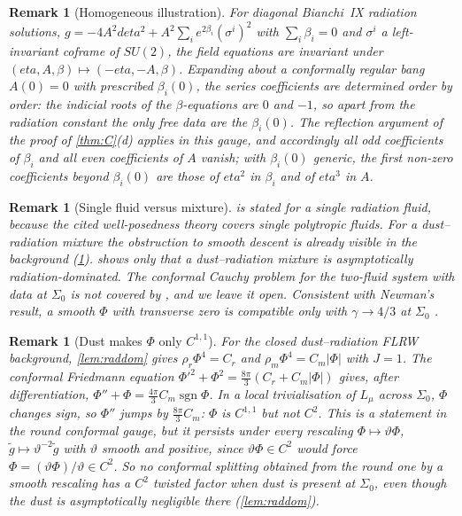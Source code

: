 \documentclass[11pt]{article}
\theoremstyle{canonmath}
\newtheorem{remark}[theorem]{Remark}
\theoremstyle{canonpostulate}
\theoremstyle{canonproposition}
\theoremstyle{canonmath}
\theoremstyle{canonproposition}
\providecommand{\Lmu}{\mathcal{L}_\mu}
\def\mathcal#1{#1}%
\def\eta{eta}%
\begin{document}
\begin{remark}[Homogeneous illustration]\label{rem:b9series}
For diagonal Bianchi~IX radiation solutions, $g = -4A^2d\eta^2 + A^2\sum_ie^{2\beta_i}(\sigma^i)^2$ with $\sum_i\beta_i = 0$ and $\sigma^i$ a left-invariant coframe of $SU(2)$, the field equations are invariant under $(\eta,A,\beta)\mapsto(-\eta,-A,\beta)$. Expanding about a conformally regular bang $A(0) = 0$ with prescribed $\beta_i(0)$, the series coefficients are determined order by order: the indicial roots of the $\beta$-equations are $0$ and $-1$, so apart from the radiation constant the only free data are the $\beta_i(0)$. The reflection argument of the proof of \cref{thm:C}(d) applies in this gauge, and accordingly all odd coefficients of $\beta_i$ and all even coefficients of $A$ vanish; with $\beta_i(0)$ generic, the first non-zero coefficients beyond $\beta_i(0)$ are those of $\eta^2$ in $\beta_i$ and of $\eta^3$ in $A$.
\end{remark}

\begin{remark}[Single fluid versus mixture]
 is stated for a single radiation fluid, because the cited well-posedness theory covers single polytropic fluids. For a dust--radiation mixture the obstruction to smooth descent is already visible in the background (\cref{rem:dust}).  shows only that a dust--radiation mixture is \emph{asymptotically} radiation-dominated. The conformal Cauchy problem for the two-fluid system with data at $\Sigma_0$ is not covered by \cite{AnguigeTod1999a}, and we leave it open. Consistent with Newman's result, a smooth $\Phi$ with transverse zero is compatible only with $\gamma\to4/3$ at $\Sigma_0$ \cite{Newman1993a,AnguigeTod1999a}.
\end{remark}

\begin{remark}[Dust makes $\Phi$ only $C^{1,1}$]\label{rem:dust}
For the closed dust--radiation FLRW background, \cref{lem:raddom} gives $\rho_r\Phi^4 = C_r$ and $\rho_m\Phi^4 = C_m|\Phi|$ with $J = 1$. The conformal Friedmann equation $\Phi'^2 + \Phi^2 = \tfrac{8\pi}{3}(C_r + C_m|\Phi|)$ gives, after differentiation, $\Phi'' + \Phi = \tfrac{4\pi}{3}C_m\operatorname{sgn}\Phi$. In a local trivialisation of $\Lmu$ across $\Sigma_0$, $\Phi$ changes sign, so $\Phi''$ jumps by $\tfrac{8\pi}{3}C_m$: $\Phi$ is $C^{1,1}$ but not $C^2$. This is a statement in the round conformal gauge, but it persists under every rescaling $\Phi\mapsto\vartheta\Phi$, $\tilde g\mapsto\vartheta^{-2}\tilde g$ with $\vartheta$ smooth and positive, since $\vartheta\Phi\in C^2$ would force $\Phi = (\vartheta\Phi)/\vartheta\in C^2$. So no conformal splitting obtained from the round one by a smooth rescaling has a $C^2$ twisted factor when dust is present at $\Sigma_0$, even though the dust is asymptotically negligible there (\cref{lem:raddom}).
\end{remark}
\end{document}
